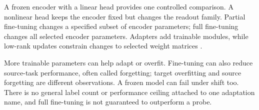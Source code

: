 \par\addvspace{\intextsep}\noindent\begin{minipage}{\linewidth}
\centering
{}
\label{fig:pretrain-adapt-timeline}
\end{minipage}\par\addvspace{\intextsep}

A frozen encoder with a linear head provides one controlled comparison. A nonlinear head keeps the encoder fixed but changes the readout family. Partial fine-tuning changes a specified subset of encoder parameters; full fine-tuning changes all selected encoder parameters. Adapters add trainable modules, while low-rank updates constrain changes to selected weight matrices \citep{howard2018ulmfit,houlsby2019adapters,hu2021lora}.

More trainable parameters can help adapt or overfit. Fine-tuning can also reduce source-task performance, often called forgetting; target overfitting and source forgetting are different observations. A frozen model can fail under shift too. There is no general label count or performance ceiling attached to one adaptation name, and full fine-tuning is not guaranteed to outperform a probe.

